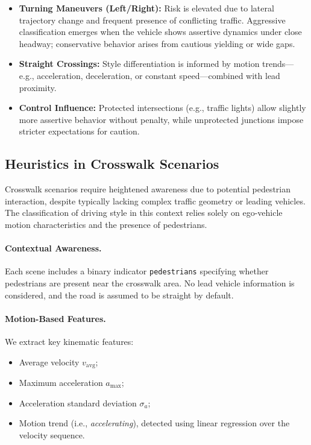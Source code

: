 \documentclass{article}
\begin{document}
\begin{itemize}[leftmargin=1em, topsep=0pt, itemsep=0.3em]
    \item \textbf{Turning Maneuvers (Left/Right):} Risk is elevated due to lateral trajectory change and frequent presence of conflicting traffic. Aggressive classification emerges when the vehicle shows assertive dynamics under close headway; conservative behavior arises from cautious yielding or wide gaps.
    
    \item \textbf{Straight Crossings:} Style differentiation is informed by motion trends—e.g., acceleration, deceleration, or constant speed—combined with lead proximity.
    
    \item \textbf{Control Influence:} Protected intersections (e.g., traffic lights) allow slightly more assertive behavior without penalty, while unprotected junctions impose stricter expectations for caution.
\end{itemize}



\subsection{Heuristics in Crosswalk Scenarios}

Crosswalk scenarios require heightened awareness due to potential pedestrian interaction, despite typically lacking complex traffic geometry or leading vehicles. The classification of driving style in this context relies solely on ego-vehicle motion characteristics and the presence of pedestrians.

\paragraph{Contextual Awareness.}
Each scene includes a binary indicator \texttt{pedestrians} specifying whether pedestrians are present near the crosswalk area. No lead vehicle information is considered, and the road is assumed to be straight by default.

\paragraph{Motion-Based Features.}
We extract key kinematic features:
\begin{itemize}[leftmargin=1em, topsep=0pt, itemsep=0.3em]
    \item Average velocity $v_{\text{avg}}$;
    \item Maximum acceleration $a_{\max}$;
    \item Acceleration standard deviation $\sigma_a$;
    \item Motion trend (i.e., \textit{accelerating}), detected using linear regression over the velocity sequence.
\end{itemize}
\end{document}

